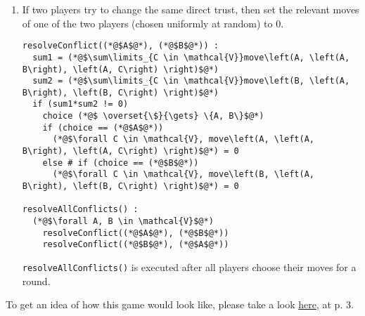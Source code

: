 \begin{enumerate}
  \newpage

  \item If two players try to change the same direct trust, then set the relevant moves of one of the two players (chosen
    uniformly at random) to 0.
  \begin{lstlisting}[label=conflict, style=numbers]
resolveConflict((*@$A$@*), (*@$B$@*)) :
  sum1 = (*@$\sum\limits_{C \in \mathcal{V}}move\left(A, \left(A, B\right), \left(A, C\right) \right)$@*)
  sum2 = (*@$\sum\limits_{C \in \mathcal{V}}move\left(B, \left(A, B\right), \left(B, C\right) \right)$@*)
  if (sum1*sum2 != 0)
    choice (*@$ \overset{\$}{\gets} \{A, B\}$@*)
    if (choice == (*@$A$@*))
      (*@$\forall C \in \mathcal{V}, move\left(A, \left(A, B\right), \left(A, C\right) \right)$@*) = 0
    else # if (choice == (*@$B$@*))
      (*@$\forall C \in \mathcal{V}, move\left(B, \left(A, B\right), \left(B, C\right) \right)$@*) = 0

resolveAllConflicts() :
  (*@$\forall A, B \in \mathcal{V}$@*)
    resolveConflict((*@$A$@*), (*@$B$@*))
    resolveConflict((*@$B$@*), (*@$A$@*))
  \end{lstlisting}
  \texttt{resolveAllConflicts()} is executed after all players choose their moves for a round.
\end{enumerate}

\noindent To get an idea of how this game would look like, please take a look
\href{http://www.agsm.edu.au/bobm/teaching/SGTM/lect06pr-3.pdf}{here}, at p. 3.

\hrulefill
\newpage
